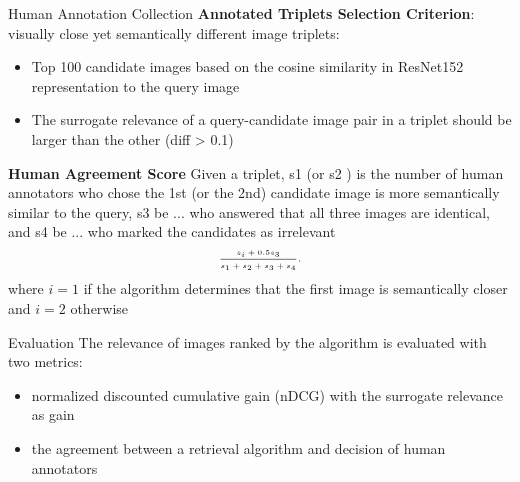 \documentclass{beamer}
\begin{document}
\begin{frame}{Human Annotation Collection}
\textbf{Annotated Triplets Selection Criterion}: visually close yet semantically different image triplets: 
    \begin{itemize}
        \item Top 100 candidate images based on the cosine similarity in ResNet152 representation to the query image
        \item The surrogate relevance of a query-candidate image pair in a triplet should be larger than the other (diff > 0.1)
    \end{itemize}

\textbf{Human Agreement Score}
Given a triplet, s1 (or s2 ) is the number of human annotators who chose the 1st (or the 2nd) candidate image is more semantically similar to the query, s3 be ... who answered that all three images are identical, and s4 be ... who marked the candidates as irrelevant
\begin{equation*}
\begin{tiny}
\begin{aligned}
\frac{s_{i}+0.5 s_{3}}{s_{1}+s_{2}+s_{3}+s_{4}},
\end{aligned}
\end{tiny}
\end{equation*}
where $i=1$ if the algorithm determines that the first image is semantically closer and $i=2$ otherwise
\end{frame}




\begin{frame}{Evaluation}
The relevance of images ranked by the algorithm is evaluated with two metrics: 
    \begin{itemize}
        \item normalized discounted cumulative gain (nDCG) with the surrogate relevance as gain
        \item the agreement between a retrieval algorithm and decision of human annotators
    \end{itemize}
\end{frame}
\end{document}
